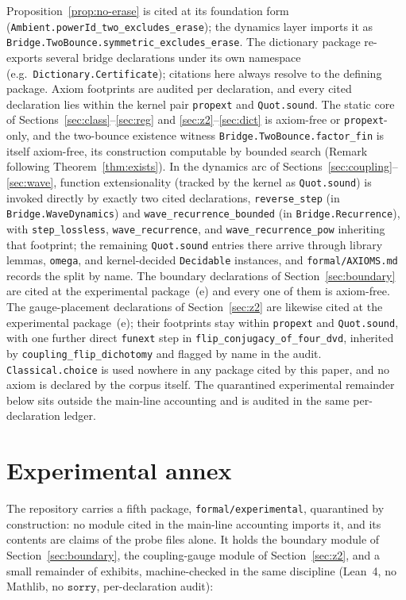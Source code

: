 \documentclass[11pt,a4paper]{article}
\theoremstyle{plain}
\theoremstyle{definition}
\theoremstyle{remark}
\begin{document}
Proposition~\ref{prop:no-erase} is cited at its foundation form
(\texttt{Ambient.powerId\_two\_excludes\_erase}); the dynamics layer
imports it as \texttt{Bridge.TwoBounce.symmetric\_excludes\_erase}. The
dictionary package re-exports several bridge declarations under its own
namespace (e.g.\ \texttt{Dictionary.Certificate}); citations here always
resolve to the defining package. Axiom footprints are audited per
declaration, and every cited declaration lies within the kernel pair
\texttt{propext} and \texttt{Quot.sound}. The static core of
Sections~\ref{sec:class}--\ref{sec:reg} and
\ref{sec:z2}--\ref{sec:dict} is axiom-free or \texttt{propext}-only,
and the two-bounce existence witness
\texttt{Bridge.TwoBounce.factor\_fin} is itself axiom-free, its
construction computable by bounded search (Remark following
Theorem~\ref{thm:exists}). In the dynamics arc of
Sections~\ref{sec:coupling}--\ref{sec:wave}, function extensionality
(tracked by the kernel as \texttt{Quot.sound}) is invoked directly by
exactly two cited declarations, \texttt{reverse\_step} (in
\texttt{Bridge.WaveDynamics}) and \texttt{wave\_recurrence\_bounded}
(in \texttt{Bridge.Recurrence}), with
\texttt{step\_lossless}, \texttt{wave\_recurrence}, and
\texttt{wave\_recurrence\_pow} inheriting that footprint; the
remaining \texttt{Quot.sound} entries there arrive through library
lemmas, \texttt{omega}, and kernel-decided \texttt{Decidable}
instances, and \texttt{formal/AXIOMS.md} records the split by name.
The boundary declarations of Section~\ref{sec:boundary} are cited at
the experimental package~(e) and every one of them is axiom-free.
The gauge-placement declarations of Section~\ref{sec:z2} are likewise
cited at the experimental package~(e); their footprints stay within
\texttt{propext} and \texttt{Quot.sound}, with one further direct
\texttt{funext} step in \texttt{flip\_conjugacy\_of\_four\_dvd},
inherited by \texttt{coupling\_flip\_dichotomy} and flagged by name
in the audit.
\texttt{Classical.choice} is used nowhere in any package cited by this
paper, and no axiom is declared by the corpus itself. The quarantined
experimental remainder below sits outside the main-line accounting and
is audited in the same per-declaration ledger.

\section*{Experimental annex}
\label{sec:annex}

The repository carries a fifth package, \texttt{formal/experimental},
quarantined by construction: no module cited in the main-line
accounting imports it, and its contents are claims of the probe files
alone. It holds the boundary module of Section~\ref{sec:boundary},
the coupling-gauge module of Section~\ref{sec:z2}, and a small
remainder of exhibits, machine-checked in the same discipline
(Lean~4, no Mathlib, no $\mathtt{sorry}$, per-declaration audit):
\end{document}
